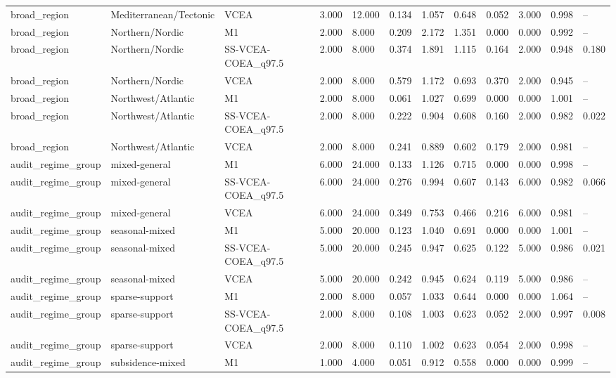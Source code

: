 \begin{table}[t]
\begin{tabular}{llllllllllll}
broad\_region & Mediterranean/Tectonic & VCEA & 3.000 & 12.000 & 0.134 & 1.057 & 0.648 & 0.052 & 3.000 & 0.998 & -- \\
broad\_region & Northern/Nordic & M1 & 2.000 & 8.000 & 0.209 & 2.172 & 1.351 & 0.000 & 0.000 & 0.992 & -- \\
broad\_region & Northern/Nordic & SS-VCEA-COEA\_q97.5 & 2.000 & 8.000 & 0.374 & 1.891 & 1.115 & 0.164 & 2.000 & 0.948 & 0.180 \\
broad\_region & Northern/Nordic & VCEA & 2.000 & 8.000 & 0.579 & 1.172 & 0.693 & 0.370 & 2.000 & 0.945 & -- \\
broad\_region & Northwest/Atlantic & M1 & 2.000 & 8.000 & 0.061 & 1.027 & 0.699 & 0.000 & 0.000 & 1.001 & -- \\
broad\_region & Northwest/Atlantic & SS-VCEA-COEA\_q97.5 & 2.000 & 8.000 & 0.222 & 0.904 & 0.608 & 0.160 & 2.000 & 0.982 & 0.022 \\
broad\_region & Northwest/Atlantic & VCEA & 2.000 & 8.000 & 0.241 & 0.889 & 0.602 & 0.179 & 2.000 & 0.981 & -- \\
audit\_regime\_group & mixed-general & M1 & 6.000 & 24.000 & 0.133 & 1.126 & 0.715 & 0.000 & 0.000 & 0.998 & -- \\
audit\_regime\_group & mixed-general & SS-VCEA-COEA\_q97.5 & 6.000 & 24.000 & 0.276 & 0.994 & 0.607 & 0.143 & 6.000 & 0.982 & 0.066 \\
audit\_regime\_group & mixed-general & VCEA & 6.000 & 24.000 & 0.349 & 0.753 & 0.466 & 0.216 & 6.000 & 0.981 & -- \\
audit\_regime\_group & seasonal-mixed & M1 & 5.000 & 20.000 & 0.123 & 1.040 & 0.691 & 0.000 & 0.000 & 1.001 & -- \\
audit\_regime\_group & seasonal-mixed & SS-VCEA-COEA\_q97.5 & 5.000 & 20.000 & 0.245 & 0.947 & 0.625 & 0.122 & 5.000 & 0.986 & 0.021 \\
audit\_regime\_group & seasonal-mixed & VCEA & 5.000 & 20.000 & 0.242 & 0.945 & 0.624 & 0.119 & 5.000 & 0.986 & -- \\
audit\_regime\_group & sparse-support & M1 & 2.000 & 8.000 & 0.057 & 1.033 & 0.644 & 0.000 & 0.000 & 1.064 & -- \\
audit\_regime\_group & sparse-support & SS-VCEA-COEA\_q97.5 & 2.000 & 8.000 & 0.108 & 1.003 & 0.623 & 0.052 & 2.000 & 0.997 & 0.008 \\
audit\_regime\_group & sparse-support & VCEA & 2.000 & 8.000 & 0.110 & 1.002 & 0.623 & 0.054 & 2.000 & 0.998 & -- \\
audit\_regime\_group & subsidence-mixed & M1 & 1.000 & 4.000 & 0.051 & 0.912 & 0.558 & 0.000 & 0.000 & 0.999 & -- \\

\end{tabular}
\end{table}
